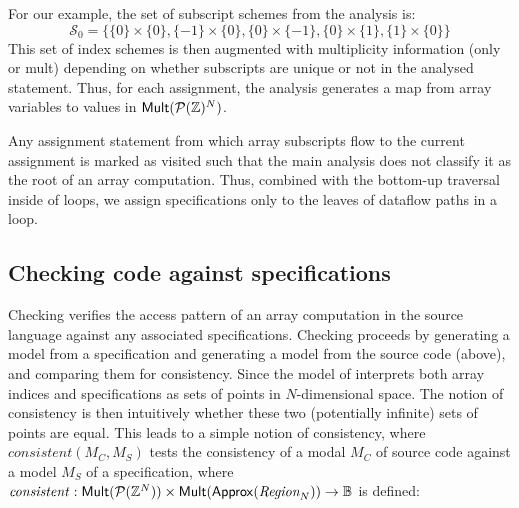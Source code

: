 For our example, the set of subscript schemes from the analysis is:
%
\begin{equation*}
\mathcal{S}_0 = \{\{0\} \times \{0\}, \{-1\} \times \{0\},
\{0\} \times \{-1\}, \{0\} \times \{1\}, \{1\} \times \{0\}\}
\end{equation*}
%
This set of index schemes is then augmented with multiplicity
information (\textsf{only} or \textsf{mult}) depending on whether
subscripts are unique or not in the analysed statement.
Thus, for each assignment, the analysis generates a map from array
variables to values in $\mathsf{Mult}(\mathcal{P}(\textnormal{$\mathbb{Z}$})^N)$.

Any assignment statement from which array subscripts flow to the
current assignment is marked as visited such that the main analysis
does not classify it as the root of an array computation.  Thus,
combined with the bottom-up traversal inside of loops, we assign
specifications only to the leaves of dataflow paths in a loop.

\subsection{Checking code against specifications}
\label{subsec:checking}

\noindent
Checking verifies the access pattern of an array computation in the
source language against any associated specifications. Checking
proceeds by generating a model from a specification and generating a
model from the source code (above), and comparing them for
consistency.  Since the model of  interprets both
array indices and specifications as sets of points in $N$-dimensional
space. The notion of consistency is then intuitively whether these two
(potentially infinite) sets of points are equal. This leads to a
simple notion of consistency, where $\mathit{consistent}(M_C, M_S)$
tests the consistency of a modal $M_C$ of source code against
a model $M_S$ of a specification, where
$\mathit{consistent} :
    \mathsf{Mult}(\mathcal{P}(\textnormal{$\mathbb{Z}$}{}^N)) \times
    \mathsf{Mult}(\mathsf{Approx}(\textnormal{$\textit{Region}_{N}$})) \to \mathbb{B}$ is defined:


